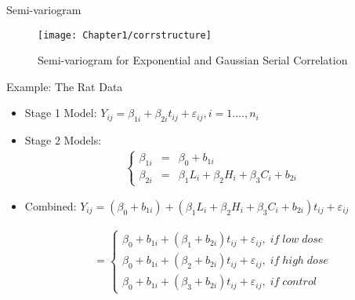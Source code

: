 \documentclass{beamer}
\begin{document}
\begin{frame}{Semi-variogram}
\begin{figure}[h!]
\centering
\texttt{[image: Chapter1/corrstructure]}
\caption{Semi-variogram for Exponential and Gaussian Serial Correlation}
\end{figure}
\end{frame}


\begin{frame}{Example: The Rat Data}
\begin{itemize}
\item Stage 1 Model: $Y_{ij} =\beta_{1i} + \beta_{2i}t_{ij}  + \varepsilon_{ij}, i=1.\dots,n_i$
\item Stage 2 Models: 	\begin{eqnarray*}
\left\{\begin{array}{rcl}
\beta_{1i} & = & \beta_{0} + b_{1i} \\
\beta_{2i} & = & \beta_{1}L_{i} + \beta_{2}H_{i}+\beta_{3}C_{i} + b_{2i}
\end{array}\right.
\end{eqnarray*}
\item Combined: $Y_{ij} =(\beta_0+b_{1i})+ (\beta_{1}L_i + \beta_{2}H_i+ \beta_{3}C_i+b_{2i})t_{ij}  + \varepsilon_{ij}$

\begin{eqnarray*}
=\left\{\begin{array}{l}
\beta_{0} + b_{1i} +(\beta_{1} + b_{2i})t_{ij}+\varepsilon_{ij}, \;if \;low \;dose\\
\beta_{0} + b_{1i} +(\beta_{2} + b_{2i})t_{ij}+\varepsilon_{ij}, \;if \;high \;dose\\
\beta_{0} + b_{1i} +(\beta_{3} + b_{2i})t_{ij}+\varepsilon_{ij}, \;if \;control
\end{array}\right.
\end{eqnarray*}
\end{itemize}
\end{frame}
\end{document}
